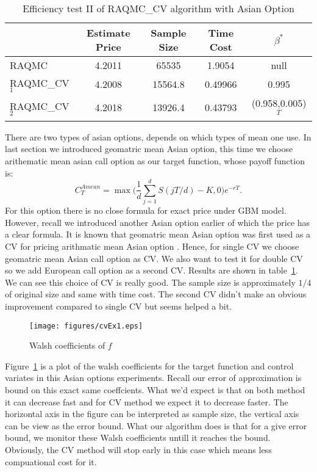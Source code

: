 \begin{table}[h]
    \centering
	\caption{Efficiency test II of RAQMC\_CV algorithm with Asian Option}
    \label{tb:efftest2a}
    \begin{tabular}{lcccc}  
    \hline\hline
    &Estimate Price&Sample Size&Time Cost&$\beta^*$\\[0.5ex]
    \hline
    RAQMC& 4.2011&65535 & 1.9054 & null\\[1ex]
    RAQMC\_CV$_1$&4.2008& 15564.8 & 0.49966& 0.995 \\[1ex]
    RAQMC\_CV$_2$&4.2018& 13926.4 & 0.43793&(0.958,0.005)$^T$\\[1ex]
    \hline
	\end{tabular}
\end{table}
There are two types of asian options, depends on which types of mean one use. 
In last section we introduced geomatric mean Asian option, this time we choose arithematic mean asian call option as our target function, whose payoff function is:
\[ C_{T}^{Amean} = \max\Big(\frac{1}{d}\sum_{j=1}^{d}S(jT/d)-K, 0\Big)e^{-rT}.\]
For this option there is no close formula for exact price under GBM model.
However, recall we introduced another Asian option earlier of which the price has a clear formula. 
It is known that geomatric mean Asian option was first used as a CV for pricing arithmatic mean Asian option \cite{kemna1990pricing}. 
Hence, for single CV we choose geomatric mean Asian call option as CV. 
We also want to test it for double CV so we add European call option as a second CV. 
Results are shown in table~\ref{tb:efftest2a}. We can see this choice of CV is really good. 
The sample size is approximately $1/4$ of original size and same with time cost. 
The second CV didn't make an obvious improvement compared to single CV but seems helped a bit.    

\begin{figure}[h]
    \centering
    \texttt{[image: figures/cvEx1.eps]}
    \caption{Walsh coefficients of $f$}
    \label{fg:cvEX1}
\end{figure}

Figure~\ref{fg:cvEX1} is a plot of the walsh coefficients for the target function and control variates in this Asian options experiments. Recall our error of approximation is bound on this exact same coeffcients. 
What we'd expect is that on both method it can decrease fast and for CV method we expect it to decrease faster.   
The horizontal axis in the figure can be interpreted as sample size, the vertical axis can be view as the error bound. What our algorithm does is that for a give error bound, we monitor these Walsh coefficients untill it reaches the bound. Obviously, the CV method will stop early in this case which means less compuational cost for it. 

